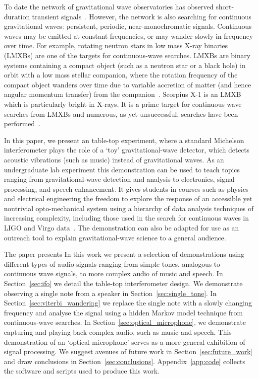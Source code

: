 \documentclass[paper-main.tex]{subfiles}
\begin{document}
To date the network of gravitational wave observatories has observed short-duration transient signals~\cite{GWTC-1:2018,GWOSC:online}. 
However, the network is also searching for continuous gravitational waves: persistent, periodic, near-monochromatic signals.
Continuous waves may be emitted at constant frequencies, or may wander slowly in frequency over time. 
For example, rotating neutron stars in low mass X-ray binaries (LMXBs) are one of the targets for continuous-wave searches. 
LMXBs are binary systems containing a compact object (such as a neutron star or a black hole) in orbit with a low mass stellar companion, where the rotation frequency of the compact object wanders over time due to variable accretion of matter (and hence angular momentum transfer) from the companion~\cite{xraybinaries:1997}. 
Scorpius X-1 is an LMXB which is particularly bright in X-rays. 
It is a prime target for continuous wave searches from LMXBs and numerous, as yet unsuccessful, searches have been performed~\cite{ScoX1O2Viterbi:2019,RadiometerO1O2:2019,SearchCrossCorrO1:2017}.


In this paper, we present an   table-top experiment, where a standard Michelson interferometer plays the role of a `toy' gravitational-wave detector, which detects acoustic vibrations (such as music) instead of gravitational waves. 
As an undergraduate lab experiment this demonstration can be used to teach topics ranging from gravitational-wave detection and analysis to electronics, signal processing, and speech enhancement. 
It gives students in courses such as physics and electrical engineering the freedom to explore the response of an accessible yet nontrivial opto-mechanical system using a hierarchy of data analysis techniques of increasing complexity, including those used in the search for continuous waves in LIGO and Virgo data~\cite{ScoX1O2Viterbi:2019,ScoX1ViterbiO1:2017,SuvorovaEtAl:2017,SuvorovaEtAl:2017}.
The demonstration can also be adapted for use as an outreach tool to explain gravitational-wave science to a general audience. 


The paper presents 
In this work we present a selection of demonstrations using different types of audio signals ranging from simple tones, analogous to continuous wave signals, to more complex audio of music and speech. 
In Section~\ref{sec:ifo} we detail the table-top interferometer design. 
We demonstrate observing a single note from a speaker in Section~\ref{sec:single_tone}.
In Section~\ref{sec:viterbi_wandering} we replace the single note with a slowly changing frequency and analyse the signal using a hidden Markov model technique from continuous-wave searches. 
In Section~\ref{sec:optical_microphone}, we demonstrate capturing and playing back complex audio, such as music and speech. 
This demonstration of an `optical microphone' serves as a more general exhibition of signal processing. 
We suggest avenues of future work in Section~\ref{sec:future_work} and draw conclusions in Section~\ref{sec:conclusions}.
Appendix~\ref{app:code} collects the software and scripts used to produce this work. 
\end{document}
